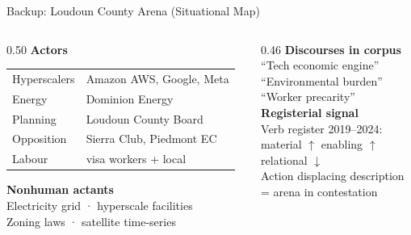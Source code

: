 \documentclass[aspectratio=169,12pt]{beamer}
\begin{document}
\appendix

\begin{frame}[noframenumbering]{Backup: Loudoun County Arena (Situational Map)}
\begin{columns}[T]
\begin{column}{0.50\textwidth}
  \small\textbf{Actors}\\[0.3em]
  \footnotesize
  \begin{tabular}{@{}ll@{}}
    Hyperscalers   & Amazon AWS, Google, Meta \\
    Energy         & Dominion Energy \\
    Planning       & Loudoun County Board \\
    Opposition     & Sierra Club, Piedmont EC \\
    Labour         & visa workers + local \\
  \end{tabular}
  \vspace{0.4em}

  \small\textbf{Nonhuman actants}\\[0.2em]
  \footnotesize
  Electricity grid · hyperscale facilities\\
  Zoning laws · satellite time-series
\end{column}
\begin{column}{0.46\textwidth}
  \small\textbf{Discourses in corpus}\\[0.3em]
  \footnotesize
  ``Tech economic engine''\\
  ``Environmental burden''\\
  ``Worker precarity''\\[0.5em]

  \small\textbf{Registerial signal}\\[0.3em]
  \footnotesize
  Verb register 2019--2024:\\
  material $\uparrow$ enabling $\uparrow$\\
  relational $\downarrow$\\[0.3em]
  \alert{Action displacing description}\\
  = arena in contestation
\end{column}
\end{columns}
\end{frame}
\end{document}
